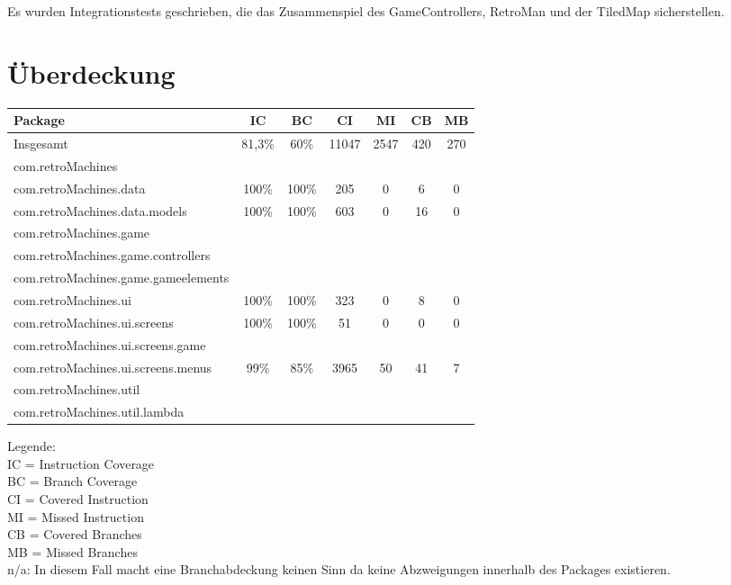 \documentclass[parskip=full]{scrreprt}
\begin{document}
Es wurden Integrationstests geschrieben, die das Zusammenspiel des GameControllers, RetroMan und der TiledMap sicherstellen.

\chapter{Überdeckung}

\begin{tabular} { | l | c | c | c | c | c | c | }
	\hline
	\textbf{Package} & \textbf{IC} & \textbf{BC} & \textbf{CI} & \textbf{MI} & \textbf{CB} & \textbf{MB} \\
	\hline
	Insgesamt & 81,3\% & 60\% & 11047 & 2547 & 420 & 270 \\
	\hline
	com.retroMachines \\
	\hline
	com.retroMachines.data & 100\% & 100\% & 205 & 0 & 6 & 0  \\
	\hline
	com.retroMachines.data.models & 100\% & 100\% & 603 & 0 & 16 & 0 \\
	\hline
	com.retroMachines.game \\
	\hline
	com.retroMachines.game.controllers \\
	\hline
	com.retroMachines.game.gameelements \\
	\hline
	com.retroMachines.ui & 100\% & 100\% & 323 & 0 & 8 & 0 \\
	\hline
	com.retroMachines.ui.screens & 100\% & 100\% & 51 & 0 & 0 & 0 \\
	\hline
	com.retroMachines.ui.screens.game \\
	\hline
	com.retroMachines.ui.screens.menus & 99\% & 85\% & 3965 & 50 & 41 & 7 \\
	\hline
	com.retroMachines.util \\
	\hline
	com.retroMachines.util.lambda \\
	\hline
\end{tabular}

Legende: \\
	IC = Instruction Coverage \\
	BC = Branch Coverage \\
	CI = Covered Instruction \\
	MI = Missed Instruction \\
	CB = Covered Branches \\
	MB = Missed Branches \\
	n/a: In diesem Fall macht eine Branchabdeckung keinen Sinn da keine Abzweigungen innerhalb des Packages existieren. \\
\end{document}
